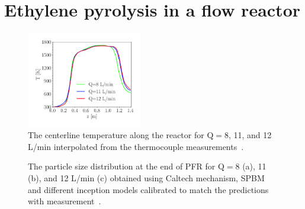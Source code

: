 \section{Ethylene pyrolysis in a flow reactor}


\begin{figure}[H]
	\centering
	\includegraphics[width=0.45\textwidth]{Figures/Results/PFR/temperature_combined.pdf}
	\caption{The centerline temperature along the reactor for $\mathrm{Q}=8$, 11, and 12 L/min interpolated from the thermocouple measurements~\citep{mei2019quantitative}.}
	\label{fig:pfr_temp} 
\end{figure}


\begin{figure}[H]
	\centering
	\caption{The particle size distribution at the end of PFR for $\mathrm{Q}=8$ (a), 11 (b), and 12 L/min (c) obtained using Caltech mechanism, SPBM and different inception models calibrated to match the predictions with measurement~\citep{mei2019quantitative}.}
	\label{fig:pfr_psd_caltech} 
\end{figure}


